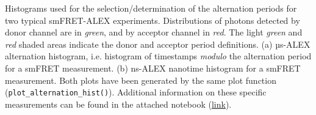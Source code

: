 \label{fig:altern_hist_double} Histograms used for the selection/determination 
of the alternation periods for two typical smFRET-ALEX experiments.
Distributions of photons detected by donor channel are in \textit{green}, and by acceptor channel in \textit{red}.
The light \textit{green} and \textit{red} shaded areas indicate the donor and acceptor period definitions.
(a) µs-ALEX alternation histogram, i.e. histogram of timestamps \textit{modulo} the alternation period for a smFRET measurement. 
(b) ns-ALEX nanotime histogram for a smFRET measurement. 
Both plots have been generated by the same plot function (\texttt{plot\_alternation\_hist()}). 
Additional information on these specific measurements can be found in the attached notebook 
(\href{http://nbviewer.jupyter.org/github/tritemio/fretbursts_paper/blob/master/notebooks/Figures%20-%20ALEX%20histograms.ipynb}{link}).